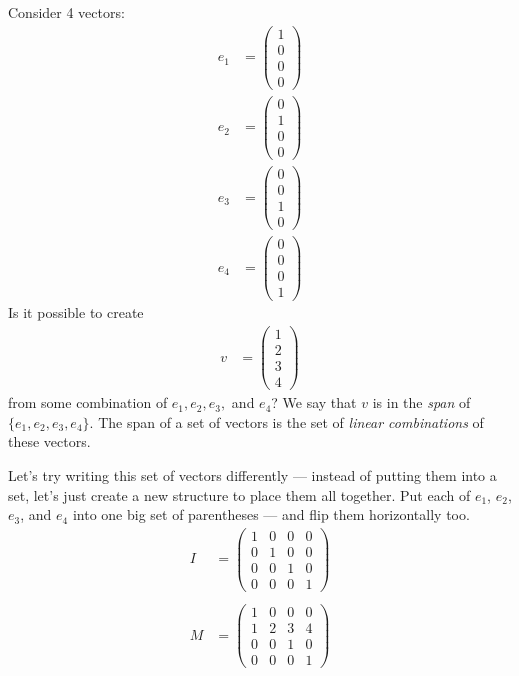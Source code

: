 \documentclass[12pt]{extarticle}
\title{}
\author{}
\date{}
\begin{document}
  Consider 4 vectors:
  \begin{align*}
    e_1 &= \begin{pmatrix}1\\0\\0\\0\end{pmatrix}\\
    e_2 &= \begin{pmatrix}0\\1\\0\\0\end{pmatrix}\\
    e_3 &= \begin{pmatrix}0\\0\\1\\0\end{pmatrix}\\
    e_4 &= \begin{pmatrix}0\\0\\0\\1\end{pmatrix}
  \end{align*}
  Is it possible to create 
  \begin{align*}
    v &= \begin{pmatrix}1\\2\\3\\4\end{pmatrix}
  \end{align*}
  from some combination of $e_1,e_2,e_3,$ and $e_4$?
  \newpage
  We say that $v$ is in the \textit{span} of $\{e_1,e_2,e_3,e_4\}$. The span of a set of vectors is the set of \textit{linear combinations} of these vectors.\\

  \vspace{15cm}

  Let's try writing this set of vectors differently --- instead of putting them into a set, let's just create a new structure to place them all together. Put each of $e_1$, $e_2$, $e_3$, and $e_4$ into one big set of parentheses --- and flip them horizontally too.
  \begin{align*}
    I &= \begin{pmatrix}1&0&0&0\\0&1&0&0\\0&0&1&0\\0&0&0&1\end{pmatrix}\\
    \\
    M &= \begin{pmatrix}1&0&0&0\\1&2&3&4\\0&0&1&0\\0&0&0&1\end{pmatrix}
  \end{align*}
  \newpage
\end{document}
